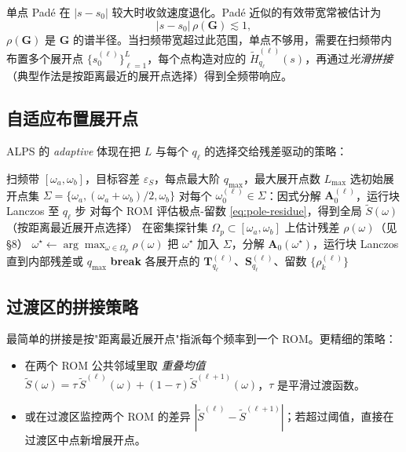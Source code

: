 \documentclass[11pt,a4paper]{ctexart}
\begin{document}
单点 Padé 在 $|s-s_0|$ 较大时收敛速度退化。Padé 近似的有效带宽常被估计为
\begin{equation}
  |s-s_0|\,\rho(\bm G) \lesssim 1,
\end{equation}
$\rho(\bm G)$ 是 $\bm G$ 的谱半径。当扫频带宽超过此范围，单点不够用，需要在扫频带内布置多个展开点 $\{s_0^{(\ell)}\}_{\ell=1}^{L}$，每个点构造对应的 $\widetilde H_{q_\ell}^{(\ell)}(s)$，再通过\emph{光滑拼接}（典型作法是按距离最近的展开点选择）得到全频带响应。

\subsection{自适应布置展开点}

ALPS 的 \emph{adaptive} 体现在把 $L$ 与每个 $q_\ell$ 的选择交给残差驱动的策略：

\begin{algorithm}[h]
\caption{自适应 ALPS 扫频}
\label{alg:adaptive-alps}
\begin{algorithmic}[1]
\Require 扫频带 $[\omega_a,\omega_b]$，目标容差 $\varepsilon_S$，每点最大阶 $q_{\max}$，最大展开点数 $L_{\max}$
\State 选初始展开点集 $\Sigma = \{\omega_a, (\omega_a+\omega_b)/2, \omega_b\}$
\State 对每个 $\omega_0^{(\ell)} \in \Sigma$：因式分解 $\bm A_0^{(\ell)}$，运行块 Lanczos 至 $q_\ell$ 步
\State 对每个 ROM 评估极点-留数 \eqref{eq:pole-residue}，得到全局 $\widetilde S(\omega)$（按距离最近展开点选择）
\Repeat
  \State 在密集探针集 $\Omega_p\subset[\omega_a,\omega_b]$ 上估计残差 $\rho(\omega)$（见 §8）
  \State $\omega^\star \gets \arg\max_{\omega\in\Omega_p} \rho(\omega)$
    \State 把 $\omega^\star$ 加入 $\Sigma$，分解 $\bm A_0(\omega^\star)$，运行块 Lanczos 直到内部残差或 $q_{\max}$
  \Else
    \State \textbf{break}
  \EndIf
\Until{}
\State \Return 各展开点的 $\bm T_{q_\ell}^{(\ell)}$、$\bm S_{q_\ell}^{(\ell)}$、留数 $\{\rho_k^{(\ell)}\}$
\end{algorithmic}
\end{algorithm}

\subsection{过渡区的拼接策略}

最简单的拼接是按"距离最近展开点"指派每个频率到一个 ROM。更精细的策略：
\begin{itemize}
\item 在两个 ROM 公共邻域里取 \emph{重叠均值} $\widetilde S(\omega) = \tau\,\widetilde S^{(\ell)}(\omega) + (1-\tau)\widetilde S^{(\ell+1)}(\omega)$，$\tau$ 是平滑过渡函数。
\item 或在过渡区监控两个 ROM 的差异 $|\widetilde S^{(\ell)}-\widetilde S^{(\ell+1)}|$；若超过阈值，直接在过渡区中点新增展开点。
\end{itemize}
\end{document}
